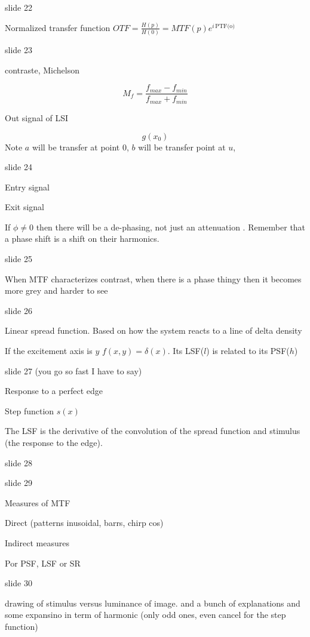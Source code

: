 \documentclass[../main/main.tex]{subfiles}
\begin{document}
slide 22

Normalized transfer function $OTF = \frac{H(p)}{H(0)} = MTF(p) e^{i\,\textrm{PTF(o)}}$


slide 23

contraste, Michelson

\begin{equation}
	M_{f} = \frac{f_{max} - f_{min}}{f_{max} + f_{min}}
\end{equation}

Out signal of LSI

\begin{equation}
	g(x_{0})
\end{equation}
Note $a$ will be transfer at point $0$, $b$ will be transfer point at $u$,

slide 24

Entry signal


Exit signal

If $\phi\neq0$ then there will be a de-phasing, not just an attenuation . Remember that a phase shift is a shift on their harmonics.

slide 25

When MTF characterizes contrast, when there is a phase thingy then it becomes more grey and harder to see


slide 26

Linear spread function. Based on how the system reacts to a line of delta density

If the excitement axis is $y$ $f(x, y) = \delta(x)$. Its LSF($l$) is related to its PSF($h$)



slide 27 (you go so fast I have to say)

Response to a perfect edge

Step function $s(x)$

The LSF is the derivative of the convolution of the spread function and stimulus (the response to the edge).

slide 28

slide 29

Measures of MTF

Direct (patterns inusoidal, barrs, chirp cos)

Indirect measures

Por PSF, LSF or SR

slide 30

drawing of stimulus versus luminance of image. and a bunch of explanations and some expansino in term of harmonic (only odd ones, even cancel for the step function)
\end{document}
